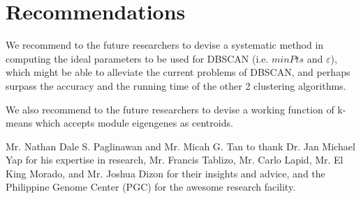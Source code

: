 \documentclass[sigconf,authordraft]{acmart}
\begin{document}
\section{Recommendations}
We recommend to the future researchers to devise a systematic method in computing the ideal parameters to be used for DBSCAN (i.e. $minPts$ and $\varepsilon$), which might be able to alleviate the current problems of DBSCAN, and perhaps surpass the accuracy and the running time of the other 2 clustering algorithms.

We also recommend to the future researchers to devise a working function of k-means which accepts module eigengenes as centroids.

\begin{acks}
Mr. Nathan Dale S. Paglinawan and Mr. Micah G. Tan to thank Dr. Jan Michael Yap for his expertise in research, Mr. Francis Tablizo, Mr. Carlo Lapid, Mr. El King Morado, and Mr. Joshua Dizon for their insights and advice, and the Philippine Genome Center (PGC) for the awesome research facility.
\end{acks}




\appendix
\end{document}
